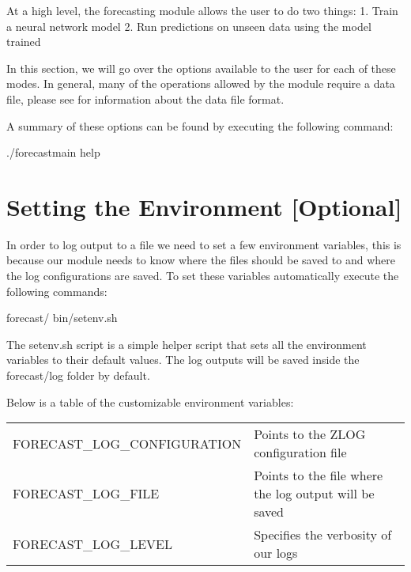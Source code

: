 \documentclass[letterpaper,10pt,english]{sphinxmanual}
\begin{document}
At a high level, the forecasting module allows the user to do two things:
1. Train a neural network model
2. Run predictions on unseen data using the model trained

In this section, we will go over the options available to the user for each of these modes.
In general, many of the operations allowed by the module require a data file, please see
{\hyperref[\detokenize{help::doc}]{}} for information about the data file format.

A summary of these options can be found by executing the following command:

\begin{sphinxVerbatim}[commandchars=\\\{\}]
./forecast\PYGZhy{}main \PYGZhy{}\PYGZhy{}help
\end{sphinxVerbatim}


\chapter{Setting the Environment {[}Optional{]}}
\label{\detokenize{usage:setting-the-environment-optional}}
In order to log output to a file we need to set a few environment variables, this is
because our module needs to know where the files should be saved to and where the log
configurations are saved. To set these variables automatically execute the following commands:

\begin{sphinxVerbatim}[commandchars=\\\{\}]
 forecast/
 bin/setenv.sh
\end{sphinxVerbatim}

The setenv.sh script is a simple helper script that sets all the environment variables to
their default values. The log outputs will be saved inside the forecast/log folder by default.

Below is a table of the customizable environment variables:

\noindent\begin{tabulary}{\linewidth}{|L|L|}
\hline
{}\relax &\relax \\
\hline
FORECAST\_LOG\_CONFIGURATION
&
Points to the ZLOG configuration file
\\
\hline
FORECAST\_LOG\_FILE
&
Points to the file where the log output will be saved
\\
\hline
FORECAST\_LOG\_LEVEL
&
Specifies the verbosity of our logs
\\
\hline\end{tabulary}
\end{document}
